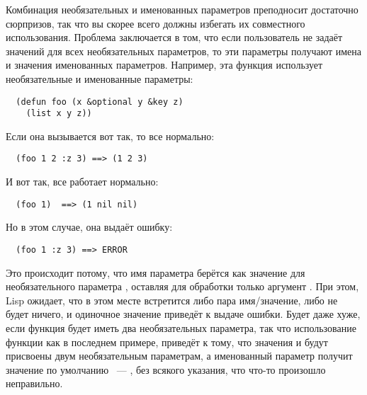 Комбинация необязательных и именованных параметров преподносит достаточно сюрпризов, так
что вы скорее всего должны избегать их совместного использования.  Проблема заключается в
том, что если пользователь не задаёт значений для всех необязательных параметров, то эти
параметры получают имена и значения именованных параметров.  Например, эта функция
использует необязательные и именованные параметры:

\begin{lstlisting}
  (defun foo (x &optional y &key z) 
    (list x y z))
\end{lstlisting}

Если она вызывается вот так, то все нормально:

\begin{verbatim}
  (foo 1 2 :z 3) ==> (1 2 3)
\end{verbatim}

И вот так, все работает нормально:

\begin{verbatim}
  (foo 1)  ==> (1 nil nil)
\end{verbatim}

Но в этом случае, она выдаёт ошибку:

\begin{verbatim}
  (foo 1 :z 3) ==> ERROR
\end{verbatim}

Это происходит потому, что имя параметра  берётся как значение для
необязательного параметра , оставляя для обработки только аргумент .  При
этом, Lisp ожидает, что в этом месте встретится либо пара имя/значение, либо не будет
ничего, и одиночное значение приведёт к выдаче ошибки.  Будет даже хуже, если функция
будет иметь два необязательных параметра, так что использование функции как в последнем
примере, приведёт к тому, что значения  и  будут присвоены двум
необязательным параметрам, а именованный параметр  получит значение по умолчанию
~--- , без всякого указания, что что-то произошло неправильно.

